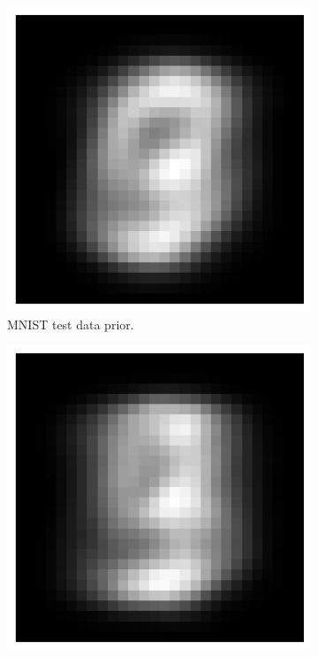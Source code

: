 \begin{figure}[t!]
    \centering
    \begin{subfigure}[t]{0.32\linewidth}
        \centering
        \includegraphics[width=0.9\linewidth]{figures/ivae/mnist/mnist-data-prior.png}
        \caption{MNIST test data prior.}
        \label{fig:mnist_data_prior}
    \end{subfigure}
    \hfill
    \begin{subfigure}[t]{0.32\linewidth}
        \centering
        \includegraphics[width=0.9\linewidth]{figures/ivae/mnist/mnist-ivae-prior.png}

\end{subfigure}
\end{figure}
